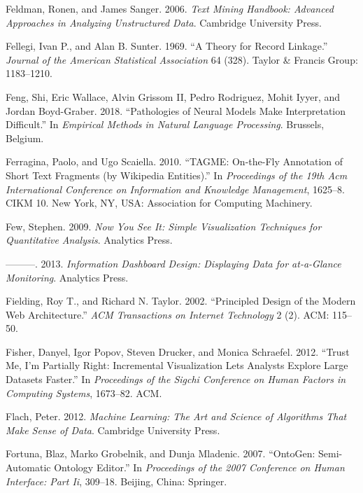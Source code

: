 \documentclass[]{krantz}
\begin{document}
\hypertarget{ref-FeldmanSanger}{}
Feldman, Ronen, and James Sanger. 2006. \emph{Text Mining Handbook:
Advanced Approaches in Analyzing Unstructured Data}. Cambridge
University Press.

\hypertarget{ref-FS69}{}
Fellegi, Ivan P., and Alan B. Sunter. 1969. ``A Theory for Record
Linkage.'' \emph{Journal of the American Statistical Association} 64
(328). Taylor \& Francis Group: 1183--1210.

\hypertarget{ref-feng-18}{}
Feng, Shi, Eric Wallace, Alvin Grissom II, Pedro Rodriguez, Mohit Iyyer,
and Jordan Boyd-Graber. 2018. ``Pathologies of Neural Models Make
Interpretation Difficult.'' In \emph{Empirical Methods in Natural
Language Processing}. Brussels, Belgium.

\hypertarget{ref-ferragina-10}{}
Ferragina, Paolo, and Ugo Scaiella. 2010. ``TAGME: On-the-Fly Annotation
of Short Text Fragments (by Wikipedia Entities).'' In \emph{Proceedings
of the 19th Acm International Conference on Information and Knowledge
Management}, 1625--8. CIKM 10. New York, NY, USA: Association for
Computing Machinery.

\hypertarget{ref-few2009now}{}
Few, Stephen. 2009. \emph{Now You See It: Simple Visualization
Techniques for Quantitative Analysis}. Analytics Press.

\hypertarget{ref-few2013information}{}
---------. 2013. \emph{Information Dashboard Design: Displaying Data for
at-a-Glance Monitoring}. Analytics Press.

\hypertarget{ref-fielding2002principled}{}
Fielding, Roy T., and Richard N. Taylor. 2002. ``Principled Design of
the Modern Web Architecture.'' \emph{ACM Transactions on Internet
Technology} 2 (2). ACM: 115--50.

\hypertarget{ref-fisher2012trust}{}
Fisher, Danyel, Igor Popov, Steven Drucker, and Monica Schraefel. 2012.
``Trust Me, I'm Partially Right: Incremental Visualization Lets Analysts
Explore Large Datasets Faster.'' In \emph{Proceedings of the Sigchi
Conference on Human Factors in Computing Systems}, 1673--82. ACM.

\hypertarget{ref-Flach}{}
Flach, Peter. 2012. \emph{Machine Learning: The Art and Science of
Algorithms That Make Sense of Data}. Cambridge University Press.

\hypertarget{ref-Ontogen}{}
Fortuna, Blaz, Marko Grobelnik, and Dunja Mladenic. 2007. ``OntoGen:
Semi-Automatic Ontology Editor.'' In \emph{Proceedings of the 2007
Conference on Human Interface: Part Ii}, 309--18. Beijing, China:
Springer.
\end{document}
